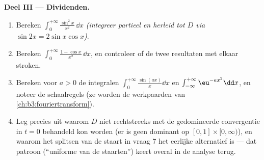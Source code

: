\begin{problem}
\medskip
\noindent\textbf{Deel III --- Dividenden.}
\begin{enumerate}[resume]
  \item Bereken $\int_0^{+\infty}\frac{\sin^2x}{x^2}\,\dd x$
        \emph{(integreer partieel en herleid tot $D$ via $\sin 2x
        = 2\sin x\cos x$)}.
  \item Bereken $\int_0^{+\infty}\frac{1 - \cos x}{x^2}\,\dd x$,
        en controleer of de twee resultaten met elkaar stroken.
  \item Bereken voor $a > 0$ de integralen
        $\int_0^{+\infty}\frac{\sin(ax)}x\dd x$ en
        $\int_{-\infty}^{+\infty}\eu^{-ax^2}\dd x$, en noteer de
        schaalregels (ze worden de werkpaarden van
        \cref{ch:b3:fouriertransform}).
  \item Leg precies uit waarom $D$ niet rechtstreeks met de
        gedomineerde convergentie in $t = 0$ behandeld kon worden
        (er is geen  dominant op
        $[0,1]\times[0,\infty)$), en waarom het splitsen van de
        staart in vraag 7 het eerlijke alternatief is --- dat
        patroon (``uniforme  van de staarten'')
        keert overal in de analyse terug.
\end{enumerate}


\end{problem}
